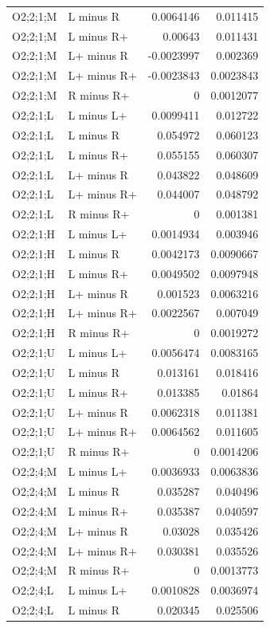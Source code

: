 {\begin{longtable}{@{}llrr@{}}
O2;2;1;M & L minus R & 0.0064146 & 0.011415 \\
O2;2;1;M & L minus R+ & 0.00643 & 0.011431 \\
O2;2;1;M & L+ minus R & -0.0023997 & 0.002369 \\
O2;2;1;M & L+ minus R+ & -0.0023843 & 0.0023843 \\
O2;2;1;M & R minus R+ & 0 & 0.0012077 \\
O2;2;1;L & L minus L+ & 0.0099411 & 0.012722 \\
O2;2;1;L & L minus R & 0.054972 & 0.060123 \\
O2;2;1;L & L minus R+ & 0.055155 & 0.060307 \\
O2;2;1;L & L+ minus R & 0.043822 & 0.048609 \\
O2;2;1;L & L+ minus R+ & 0.044007 & 0.048792 \\
O2;2;1;L & R minus R+ & 0 & 0.001381 \\
O2;2;1;H & L minus L+ & 0.0014934 & 0.003946 \\
O2;2;1;H & L minus R & 0.0042173 & 0.0090667 \\
O2;2;1;H & L minus R+ & 0.0049502 & 0.0097948 \\
O2;2;1;H & L+ minus R & 0.001523 & 0.0063216 \\
O2;2;1;H & L+ minus R+ & 0.0022567 & 0.007049 \\
O2;2;1;H & R minus R+ & 0 & 0.0019272 \\
O2;2;1;U & L minus L+ & 0.0056474 & 0.0083165 \\
O2;2;1;U & L minus R & 0.013161 & 0.018416 \\
O2;2;1;U & L minus R+ & 0.013385 & 0.01864 \\
O2;2;1;U & L+ minus R & 0.0062318 & 0.011381 \\
O2;2;1;U & L+ minus R+ & 0.0064562 & 0.011605 \\
O2;2;1;U & R minus R+ & 0 & 0.0014206 \\
O2;2;4;M & L minus L+ & 0.0036933 & 0.0063836 \\
O2;2;4;M & L minus R & 0.035287 & 0.040496 \\
O2;2;4;M & L minus R+ & 0.035387 & 0.040597 \\
O2;2;4;M & L+ minus R & 0.03028 & 0.035426 \\
O2;2;4;M & L+ minus R+ & 0.030381 & 0.035526 \\
O2;2;4;M & R minus R+ & 0 & 0.0013773 \\
O2;2;4;L & L minus L+ & 0.0010828 & 0.0036974 \\
O2;2;4;L & L minus R & 0.020345 & 0.025506 \\

\end{longtable}}
